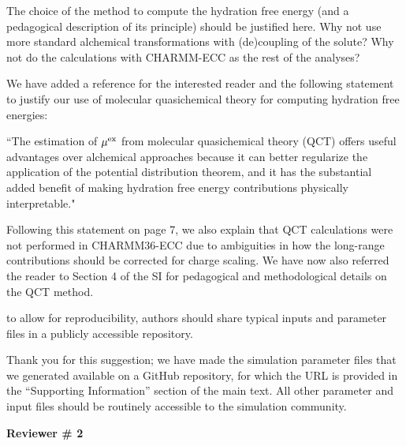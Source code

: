 \documentclass[answers,12pt]{exam}
\begin{document}
\begin{questions}
    \question The choice of the method to compute the hydration free energy (and a pedagogical description of its principle) should be justified here. Why not use more standard alchemical transformations with (de)coupling of the solute? Why not do the calculations with CHARMM-ECC as the rest of the analyses?
    \begin{solution}
    We have added a reference for the interested reader and the following statement to justify our use of molecular quasichemical theory for computing hydration free energies:
    
    ``The estimation of $\mu^{\rm{ex}}$ from molecular quasichemical theory (QCT) offers useful advantages over alchemical approaches because it can better regularize the application of the potential distribution theorem, and it has the substantial added benefit of making hydration free energy contributions physically interpretable." 
    
    Following this statement on page 7, we also explain that QCT calculations were not performed in CHARMM36-ECC due to ambiguities in how the long-range contributions should be corrected for charge scaling. We have now also referred the reader to Section 4 of the SI for pedagogical and methodological details on the QCT method. 
    \end{solution}
 
 
    \question to allow for reproducibility, authors should share typical inputs and parameter files in a publicly accessible repository.
    \begin{solution}
    Thank you for this suggestion; we have made the simulation parameter files that we generated available on a GitHub repository, for which the URL is provided in the “Supporting Information” section of the main text. All other parameter and input files should be routinely accessible to the simulation community. 
    \end{solution}


\end{questions}
 
\newpage
\textbf{Reviewer \# 2}
\end{document}
